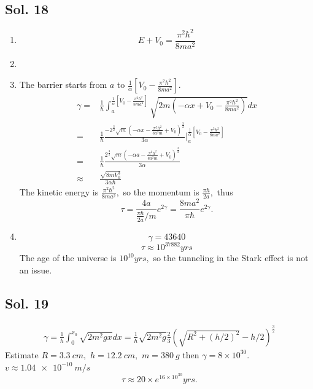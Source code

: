 \subsection*{Sol. 18}
\begin{enumerate}
    \item 
    $$
    E+V_0= \frac{\pi^2\hbar^2}{8ma^2}
    $$
    \item 
    \item 
    The barrier starts from $a$ to $\frac{1}{\alpha}\left[
    V_0-\frac{\pi^2\hbar^2}{8ma^2}
    \right].$
    \begin{align*}
        \gamma =& \frac{1}{\hbar}
        \int_a^{\frac{1}{\alpha}\left[
    V_0-\frac{\pi^2\hbar^2}{8ma^2}
    \right]}\sqrt{2m(-\alpha x +V_0-\frac{\pi^2\hbar^2}{8ma^2})}dx\\
    =&
    \frac{1}{\hbar}
    \frac{-2^{\frac{3}{2}} \sqrt{m} \left(-{\alpha}x - \frac{\pi^{2} h^{2}}{8a^{2} m} + V_{0}\right)^{\frac{3}{2}}}{3{\alpha}}
    \bigg|^{\frac{1}{\alpha}\left[
    V_0-\frac{\pi^2\hbar^2}{8ma^2}
    \right]}_a\\
    =&
     \frac{1}{\hbar}
    \frac{2^{\frac{3}{2}} \sqrt{m} \left(-{\alpha}a - \frac{\pi^{2} h^{2}}{8a^{2} m} + V_{0}\right)^{\frac{3}{2}}}{3{\alpha}}\\
    \approx &
     \frac{\sqrt{8mV_0^3}}{3\alpha\hbar}
    \end{align*}
    The kinetic energy is $\frac{\pi^2\hbar^2}{8ma^2},$ so the momentum is $\frac{\pi\hbar}{2a},$ thus 
    $$
    \tau = \frac{4a}{\frac{\pi\hbar}{2a}/m}e^{2\gamma}
    =\frac{8ma^2}{\pi\hbar}e^{2\gamma}.
    $$
    \item $$
    \gamma = 43640
    $$
    $$
    \tau\approx 10^{37882}yrs
    $$
    The age of the universe is $10^{10}yrs,$ so the tunneling in the Stark effect is not an issue.
    
    
\end{enumerate}

\subsection*{Sol. 19}
\begin{align*}
    \gamma = \frac{1}{\hbar}\int_0^{x_0}
    \sqrt{2m^2gx}dx
    =\frac{1}{\hbar}\sqrt{2m^2 g}\frac{2}{3}(\sqrt{R^2+(h/2)^2}-h/2)^{\frac{3}{2}}
\end{align*}
Estimate $R=\qty{3.3}{cm},$ $h=\qty{12.2}{cm},$ $m=\qty{380}{g}$ then $\gamma=8\times 10^{30}.$
$
v\approx \qty{1.04e-10}{m/s}
$
$$
\tau \approx 20\times  e^{16\times 10^{30}} yrs.
$$

